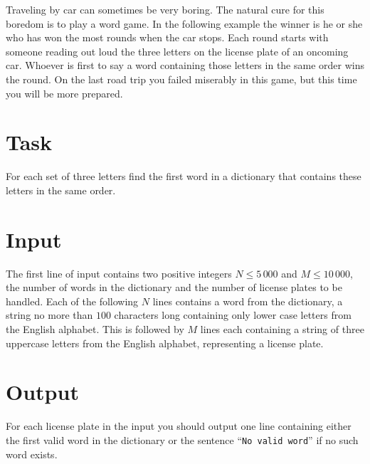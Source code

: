 

Traveling by car can sometimes be very boring. The natural cure for
this boredom is to play a word game. In the following example the
winner is he or she who has won the most rounds when the car
stops. Each round starts with someone reading out loud the three
letters on the license plate of an oncoming car. Whoever is first to
say a word containing those letters in the same order wins the
round. On the last road trip you failed miserably in this game, but
this time you will be more prepared.

\section*{Task}
For each set of three letters find the first word in a dictionary that contains these letters in the same order.

\section*{Input}
The first line of input contains two positive integers $N \leq 5\,000$ and $M \leq 10\,000$, the number of words in the dictionary and the number of license plates to be handled. Each of the following $N$ lines contains a word from the dictionary, a string no more than $100$ characters long containing only lower case letters from the English alphabet. This is followed by $M$ lines each containing a string of three uppercase letters from the English alphabet, representing a license plate.

\section*{Output}
For each license plate in the input you should output one line containing either the first valid word in the dictionary or the sentence ``\verb|No valid word|'' if no such word exists.

